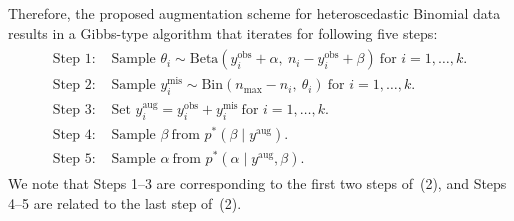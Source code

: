 \documentclass[12pt]{article}
\begin{document}
\begin{appendix}
Therefore, the proposed augmentation scheme for heteroscedastic Binomial data  results in a Gibbs-type algorithm that iterates for following five steps:
\begin{align}
\begin{aligned}\nonumber
\textrm{Step 1: }& \textrm{Sample } \theta_i\sim\textrm{Beta}(y_i^{\textrm{obs}}+\alpha,~ n_i-y_i^{\textrm{obs}}+\beta)~\textrm{for }i=1, \ldots, k.\\
\textrm{Step 2: }& \textrm{Sample } y^{\textrm{mis}}_i\sim\textrm{Bin}(n_{\textrm{max}}-n_i,~ \theta_i)~\textrm{for }i=1, \ldots, k.\\
\textrm{Step 3: }& \textrm{Set } y^{\textrm{aug}}_i=y^{\textrm{obs}}_i+y^{\textrm{mis}}_i~\textrm{for }i=1, \ldots, k.\\
\textrm{Step 4: }& \textrm{Sample } \beta~ \textrm{from } p^\ast(\beta\mid y^{\textrm{aug}}).\\
\textrm{Step 5: }& \textrm{Sample } \alpha~ \textrm{from } p^\ast(\alpha\mid y^{\textrm{aug}}, \beta).
\end{aligned}
\end{align}
We note that Steps 1--3 are corresponding to the first two steps of~(2), and Steps 4--5 are related to the last step of~(2).


\end{appendix}






\end{document}
